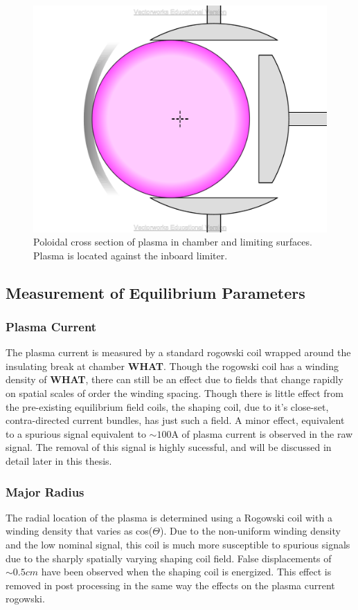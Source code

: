 \begin{figure}
\includegraphics[width = \textwidth]{./figures/Poloidal_Cross_Section_v2013.pdf}\begin{flushleft}
\caption{Poloidal cross section of plasma in chamber and limiting surfaces.  Plasma is located against the inboard limiter.}
\end{flushleft}
\label{original_limiters}
\end{figure}

\subsection{Measurement of Equilibrium Parameters}
\subsubsection{Plasma Current}
The plasma current is measured by a standard rogowski coil wrapped around the insulating break at chamber \textbf{WHAT}.  Though the rogowski coil has a winding density of  \textbf{WHAT}, there can still be an effect due to fields that change rapidly on spatial scales of order the winding spacing.  Though there is little effect from the pre-existing equilibrium field coils, the shaping coil, due to it's close-set, contra-directed current bundles, has just such a field.  A minor effect, equivalent to a spurious signal equivalent to $\sim 100$A of plasma current is observed in the raw signal.  The removal of this signal is highly sucessful, and will be discussed in detail later in this thesis.
\subsubsection{Major Radius}
The radial location of the plasma is determined using a Rogowski coil with a winding density that varies as cos($\Theta$).  Due to the non-uniform winding density and the low nominal signal, this coil is much more susceptible to spurious signals due to the sharply spatially varying shaping coil field.  False displacements of $\sim 0.5cm$ have been observed when the shaping coil is energized.  This effect is removed in post processing in the same way the effects on the plasma current rogowski.
